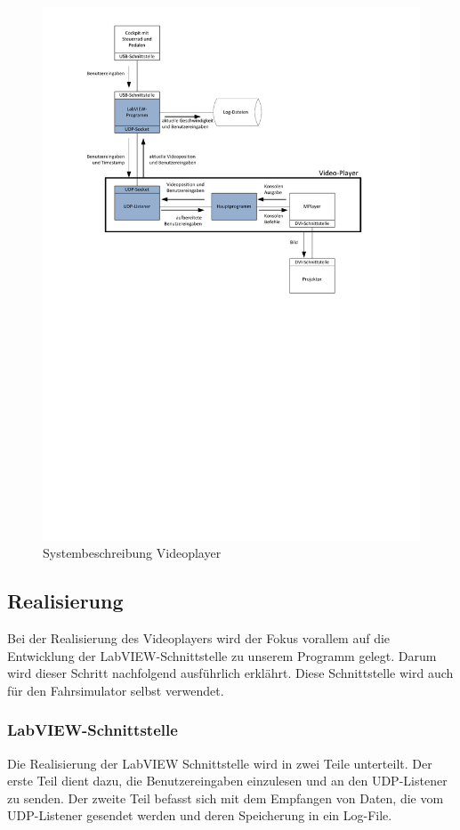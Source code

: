 \begin{figure}[H]
\centering 
\includegraphics[width=0.8\linewidth]{src/Systembeschreibung_VideoPlayer.pdf}
\caption{Systembeschreibung Videoplayer} %
\label{Systembeschreibung Videoplayer} %
\end{figure}

\subsection{Realisierung}
Bei der Realisierung des Videoplayers wird der Fokus vorallem auf die Entwicklung der LabVIEW-Schnittstelle zu unserem Programm gelegt. Darum wird dieser Schritt nachfolgend ausführlich erklährt. Diese Schnittstelle wird auch für den Fahrsimulator selbst verwendet.

\subsubsection{LabVIEW-Schnittstelle}
\label{labview_schnittstelle}
Die Realisierung der LabVIEW Schnittstelle wird in zwei Teile unterteilt. Der erste Teil dient dazu, die Benutzereingaben einzulesen und an den UDP-Listener zu senden. Der zweite Teil befasst sich mit dem Empfangen von Daten, die vom UDP-Listener gesendet werden und deren Speicherung in ein Log-File.

